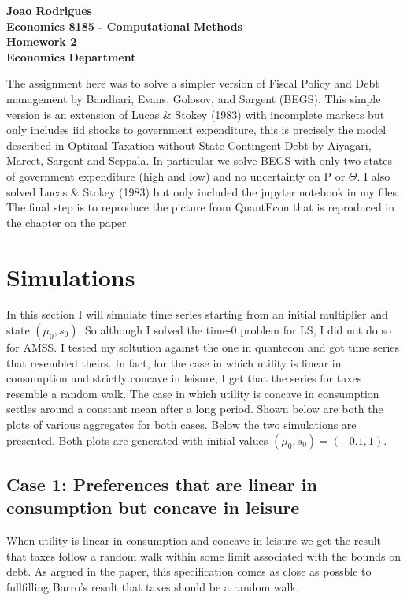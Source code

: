 \documentclass{article} %
\begin{document}
\begin{center}
  \textbf{Joao Rodrigues} \\
  \textbf{Economics 8185 - Computational Methods} \\
  \textbf{Homework 2} \\
  \textbf{Economics Department}
\end{center}
The assignment here was to solve a simpler version of Fiscal Policy and Debt management by Bandhari, Evans, Golosov, and Sargent (BEGS). This simple version is an extension of Lucas \& Stokey (1983) with incomplete markets but only includes iid shocks to government expenditure, this is precisely the model described in Optimal Taxation without State Contingent Debt by Aiyagari, Marcet, Sargent and Seppala. In particular we solve BEGS with only two states of government expenditure (high and low) and no uncertainty on P or $\Theta$. I also solved Lucas \& Stokey (1983) but only included the jupyter notebook in my files. The final step is to reproduce the picture from QuantEcon that is reproduced in the chapter on the paper. 
\section*{Simulations}
In this section I will simulate time series starting from an initial multiplier and state $(\mu_0, s_0)$. So although I solved the time-0 problem for LS, I did not do so for AMSS. I tested my soltution against the one in quantecon and got time series that resembled theirs. In fact, for the case in which utility is linear in consumption and strictly concave in leisure, I get that the series for taxes resemble a random walk. The case in which utility is concave in consumption settles around a constant mean after a long period. Shown below are both the plots of various aggregates for both cases. Below the two simulations are presented. Both plots are generated with initial values $(\mu_0, s_0)= (-0.1,1)$. 

\subsection*{Case 1: Preferences that are linear in consumption but concave in leisure}
When utility is linear in consumption and concave in leisure we get the result that taxes follow a random walk within some limit associated with the bounds on debt. As argued in the paper, this specification comes as close as possble to fullfilling Barro's result that taxes should be a random walk. 
\end{document}
